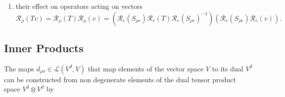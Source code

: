 \documentclass[aps,preprint]{revtex4}
\begin{document}
\begin{enumerate}
\begin{enumerate}
\item their effect on operators acting on vectors%
\begin{equation}
\mathcal{R}_{\rho }\left( Tv\right) =\mathcal{R}_{\rho }\left( T\right) 
\mathcal{R}_{\rho }\left( v\right) =\left( \mathcal{R}_{e}\left( S_{\rho
e}\right) \mathcal{R}_{e}\left( T\right) \mathcal{R}_{e}\left( S_{\rho
e}\right) ^{-1}\right) \left( \mathcal{R}_{e}\left( S_{\rho e}\right) 
\mathcal{R}_{e}\left( v\right) \right) .
\end{equation}
\end{enumerate}
\end{enumerate}

\subsection{Inner Products}

The maps $d_{\rho \sigma }\in \mathcal{L}\left( V^{d},V\right) $ \label{maps
from a vector space to its dual defined by dual second rank tensors} that
map elements of the vector space $V$ to its dual $V^{d}$ can be constructed
from non degenerate elements of the dual tensor product space $V^{d}\otimes
V^{d}$ by
\end{document}
